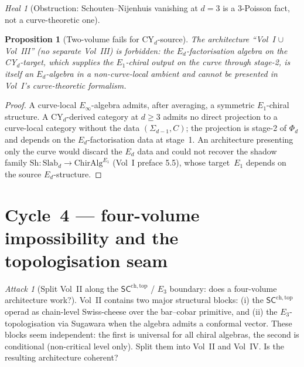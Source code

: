 \documentclass[11pt]{article}
\newtheorem{prop}[thm]{Proposition}
\theoremstyle{definition}
\theoremstyle{remark}
\newtheorem{attack}[thm]{Attack}
\newtheorem{heal}[thm]{Heal}
\newcommand{\SCchtop}{\mathsf{SC}^{\mathrm{ch,top}}}
\newcommand{\Eone}{E_1}
\newcommand{\Ethree}{E_3}
\newcommand{\Einf}{E_\infty}
\begin{document}
\begin{heal}[Obstruction: Schouten--Nijenhuis vanishing at $d = 3$
is a $3$-Poisson fact, not a curve-theoretic one]
\begin{prop}[Two-volume fails for CY$_d$-source]
\label{prop:two-volume-fails}
The architecture ``Vol~I $\cup$ Vol~III'' (no separate Vol~III) is
forbidden: the $E_d$-factorisation algebra on the CY$_d$-target,
which supplies the $\Eone$-chiral output on the curve through
stage-2, is itself an $E_d$-algebra in a non-curve-local ambient
and cannot be presented in Vol~I's curve-theoretic formalism.
\end{prop}

\begin{proof}
A curve-local $\Einf$-algebra admits, after averaging, a symmetric
$\Eone$-chiral structure. A CY$_d$-derived category at $d \geq 3$
admits no direct projection to a curve-local category without the
data $(\Sigma_{d-1}, C)$; the projection is stage-2 of $\Phi_d$
and depends on the $E_d$-factorisation data at stage~1. An
architecture presenting only the curve would discard the $E_d$ data
and could not recover the shadow family
$\mathrm{Sh}\colon \mathrm{Slab}_d \to \mathrm{ChirAlg}^{\Eone}$
(Vol~I preface 5.5), whose target~$\Eone$ depends on the source
$E_d$-structure.
\end{proof}
\end{heal}

\section{Cycle~4 --- four-volume impossibility and the
topologisation seam}

\begin{attack}[Split Vol~II along the $\SCchtop$ / $\Ethree$
boundary: does a four-volume architecture work?]
\label{att:four-volume}
Vol~II contains two major structural blocks: (i) the $\SCchtop$
operad as chain-level Swiss-cheese over the bar--cobar primitive,
and (ii) the $\Ethree$-topologisation via Sugawara when the
algebra admits a conformal vector. These blocks seem independent:
the first is universal for all chiral algebras, the second is
conditional (non-critical level only). Split them into Vol~II and
Vol~IV. Is the resulting architecture coherent?
\end{attack}
\end{document}
